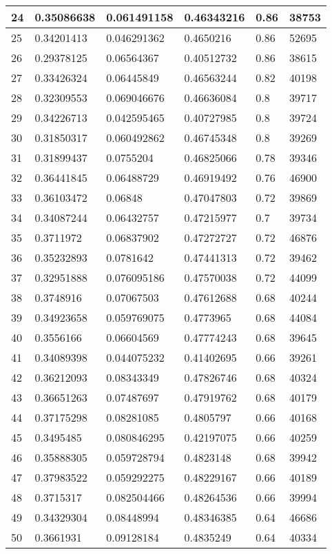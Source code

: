\begin{longtable}{|l|l|l|l|l|l|}
24 & 0.35086638 & 0.061491158 & 0.46343216 & 0.86 & 38753 \\ \hline 
25 & 0.34201413 & 0.046291362 & 0.4650216 & 0.86 & 52695 \\ \hline 
26 & 0.29378125 & 0.06564367 & 0.40512732 & 0.86 & 38615 \\ \hline 
27 & 0.33426324 & 0.06445849 & 0.46563244 & 0.82 & 40198 \\ \hline 
28 & 0.32309553 & 0.069046676 & 0.46636084 & 0.8 & 39717 \\ \hline 
29 & 0.34226713 & 0.042595465 & 0.40727985 & 0.8 & 39724 \\ \hline 
30 & 0.31850317 & 0.060492862 & 0.46745348 & 0.8 & 39269 \\ \hline 
31 & 0.31899437 & 0.0755204 & 0.46825066 & 0.78 & 39346 \\ \hline 
32 & 0.36441845 & 0.06488729 & 0.46919492 & 0.76 & 46900 \\ \hline 
33 & 0.36103472 & 0.06848 & 0.47047803 & 0.72 & 39869 \\ \hline 
34 & 0.34087244 & 0.06432757 & 0.47215977 & 0.7 & 39734 \\ \hline 
35 & 0.3711972 & 0.06837902 & 0.47272727 & 0.72 & 46876 \\ \hline 
36 & 0.35232893 & 0.0781642 & 0.47441313 & 0.72 & 39462 \\ \hline 
37 & 0.32951888 & 0.076095186 & 0.47570038 & 0.72 & 44099 \\ \hline 
38 & 0.3748916 & 0.07067503 & 0.47612688 & 0.68 & 40244 \\ \hline 
39 & 0.34923658 & 0.059769075 & 0.4773965 & 0.68 & 44084 \\ \hline 
40 & 0.3556166 & 0.06604569 & 0.47774243 & 0.68 & 39645 \\ \hline 
41 & 0.34089398 & 0.044075232 & 0.41402695 & 0.66 & 39261 \\ \hline 
42 & 0.36212093 & 0.08343349 & 0.47826746 & 0.68 & 40324 \\ \hline 
43 & 0.36651263 & 0.07487697 & 0.47919762 & 0.68 & 40179 \\ \hline 
44 & 0.37175298 & 0.08281085 & 0.4805797 & 0.66 & 40168 \\ \hline 
45 & 0.3495485 & 0.080846295 & 0.42197075 & 0.66 & 40259 \\ \hline 
46 & 0.35888305 & 0.059728794 & 0.4823148 & 0.68 & 39942 \\ \hline 
47 & 0.37983522 & 0.059292275 & 0.48229167 & 0.66 & 40189 \\ \hline 
48 & 0.3715317 & 0.082504466 & 0.48264536 & 0.66 & 39994 \\ \hline 
49 & 0.34329304 & 0.08448994 & 0.48346385 & 0.64 & 46686 \\ \hline 
50 & 0.3661931 & 0.09128184 & 0.4835249 & 0.64 & 40334 \\ \hline 
\end{longtable}